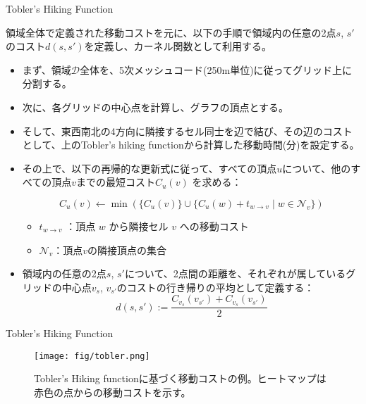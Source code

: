\documentclass[xelatex, 8pt]{beamer}
\theoremstyle{plain}
\theoremstyle{definition}
\begin{document}
\begin{frame}{Tobler's Hiking Function}

領域全体で定義された移動コストを元に、以下の手順で領域内の任意の2点$s$, $s'$のコスト$d(s, s')$を定義し、カーネル関数として利用する。
\begin{itemize}
    \item まず、領域$\mathcal{D}$全体を、5次メッシュコード(250m単位)に従ってグリッド上に分割する。

\item 次に、各グリッドの中心点を計算し、グラフの頂点とする。

\item そして、東西南北の4方向に隣接するセル同士を辺で結び、その辺のコストとして、上のTobler's hiking functionから計算した移動時間(分)を設定する。

\item その上で、以下の再帰的な更新式に従って、すべての頂点$u$について、他のすべての頂点$v$までの最短コスト$C_u(v)$ を求める：

$$
C_u(v) \leftarrow \min\left(\{C_u(v)\}\cup \{C_u(w) + t_{w\rightarrow v} \mid w \in \mathcal{N}_v\}\right)
$$

\begin{itemize}
    \item $t_{w\rightarrow v}$ ：頂点 $w$ から隣接セル $v$ への移動コスト
    \item $\mathcal{N}_v$：頂点$v$の隣接頂点の集合
\end{itemize}

\item 領域内の任意の2点$s$, $s'$について、2点間の距離を、それぞれが属しているグリッドの中心点$v_s$, $v_{s'}$のコストの行き帰りの平均として定義する：
$$d(s, s') := \frac{C_{v_s}(v_{s'}) + C_{v_s}(v_{s'})}{2}$$

\end{itemize}

\end{frame}

\begin{frame}{Tobler's Hiking Function}
\begin{figure}\centering\texttt{[image: fig/tobler.png]}\caption{Tobler's Hiking functionに基づく移動コストの例。ヒートマップは赤色の点からの移動コストを示す。}
\end{figure}
\end{frame}
\end{document}
